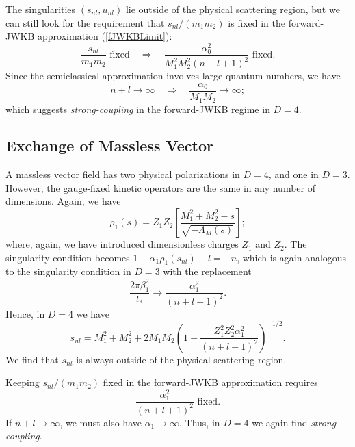 The singularities $(s_{nl}, u_{nl})$ lie outside of the physical scattering region, but we can still look for the requirement that $s_{nl} / (m_{1} m_{2})$ is fixed in the forward-JWKB approximation (\ref{fJWKBLimit}):
\begin{equation}
	\frac{s_{nl}}{m_{1} m_{2}} \text{ fixed} \quad \Longrightarrow \quad \frac{\alpha_{0}^{2}}{M_{1}^{2} M_{2}^{2} (n + l + 1)^{2}} \text{ fixed}.
\end{equation}
Since the semiclassical approximation involves large quantum numbers, we have
\begin{equation}
	n + l \rightarrow \infty \quad \Longrightarrow \quad \frac{\alpha_{0}}{M_{1} M_{2}} \rightarrow \infty;
\end{equation}
which suggests \textit{strong-coupling} in the forward-JWKB regime in $D = 4$.
\subsection{Exchange of Massless Vector}
A massless vector field has two physical polarizations in $D = 4$, and one in $D = 3$. However, the gauge-fixed kinetic operators are the same in any number of dimensions. Again, we have
\begin{equation}
	\rho_{1}(s) = Z_{1} Z_{2} \left[ \frac{M_{1}^{2} + M_{2}^{2} - s}{\sqrt{-\Lambda_{M}(s)}} \right];
\end{equation}
where, again, we have introduced dimensionless charges $Z_{1}$ and $Z_{2}$. The singularity condition becomes $1 - \alpha_{1} \rho_{1}(s_{nl}) + l = -n$, which is again analogous to the singularity condition in $D = 3$ with the replacement
\begin{equation}
	\frac{2 \pi \beta_{1}^{2}}{t_{*}} \longrightarrow \frac{\alpha_{1}^{2}}{(n + l + 1)^{2}}.
\end{equation}
Hence, in $D = 4$ we have
\begin{equation}
	s_{nl} = M_{1}^{2} + M_{2}^{2} + 2 M_{1} M_{2} \left(1 + \frac{Z_{1}^{2} Z_{2}^{2} \alpha_{1}^{2}}{(n + l + 1)^{2}} \right)^{-1/2}.
	\label{sJ1}
\end{equation}
We find that $s_{nl}$ is always outside of the physical scattering region.

Keeping $s_{nl}/(m_{1} m_{2})$ fixed in the forward-JWKB approximation requires
\begin{equation}
	\frac{\alpha_{1}^{2}}{(n + l + 1)^{2}} \text{ fixed}.
\end{equation}
If $n + l \rightarrow \infty$, we must also have $\alpha_{1} \rightarrow \infty$. Thus, in $D = 4$ we again find \textit{strong-coupling}.
